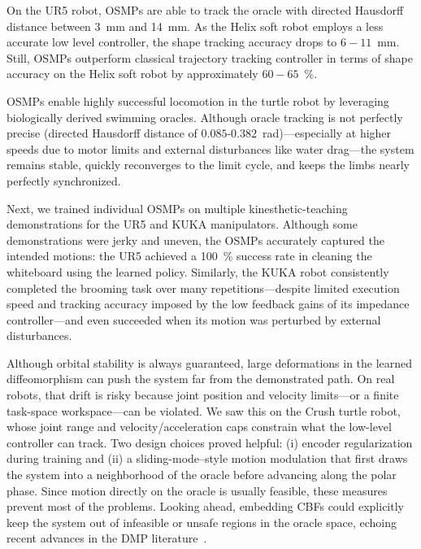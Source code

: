 On the UR5 robot, \glspl{OSMP} are able to track the oracle with directed Hausdorff distance between \SI{3}{mm} and \SI{14}{mm}. As the Helix soft robot employs a less accurate low level controller, the shape tracking accuracy drops to $6-11$~\si{mm}. Still, \glspl{OSMP} outperform classical trajectory tracking controller in terms of shape accuracy on the Helix soft robot by approximately $60-65$~\%.

\glspl{OSMP} enable highly successful locomotion in the turtle robot by leveraging biologically derived swimming oracles. Although oracle tracking is not perfectly precise (directed Hausdorff distance of $0.085$-$0.382$~rad)—especially at higher speeds due to motor limits and external disturbances like water drag—the system remains stable, quickly reconverges to the limit cycle, and keeps the limbs nearly perfectly synchronized.

Next, we trained individual \glspl{OSMP} on multiple kinesthetic-teaching demonstrations for the UR5 and KUKA manipulators. Although some demonstrations were jerky and uneven, the \glspl{OSMP} accurately captured the intended motions: the UR5 achieved a \SI{100}{\percent} success rate in cleaning the whiteboard using the learned policy. Similarly, the KUKA robot consistently completed the brooming task over many repetitions—despite limited execution speed and tracking accuracy imposed by the low feedback gains of its impedance controller—and even succeeded when its motion was perturbed by external disturbances.

Although orbital stability is always guaranteed, large deformations in the learned diffeomorphism can push the system far from the demonstrated path. On real robots, that drift is risky because joint position and velocity limits—or a finite task-space workspace—can be violated. We saw this on the Crush turtle robot, whose joint range and velocity/acceleration caps constrain what the low-level controller can track. Two design choices proved helpful: (i) encoder regularization during training and (ii) a sliding-mode–style motion modulation that first draws the system into a neighborhood of the oracle before advancing along the polar phase. Since motion directly on the oracle is usually feasible, these measures prevent most of the problems. Looking ahead, embedding \glspl{CBF} could explicitly keep the system out of infeasible or unsafe regions in the oracle space, echoing recent advances in the \gls{DMP} literature~\citep{davoodi2022rule,nawaz2024learning,mohammadi2024extended,simmoteit2025diffeomorphic}.

